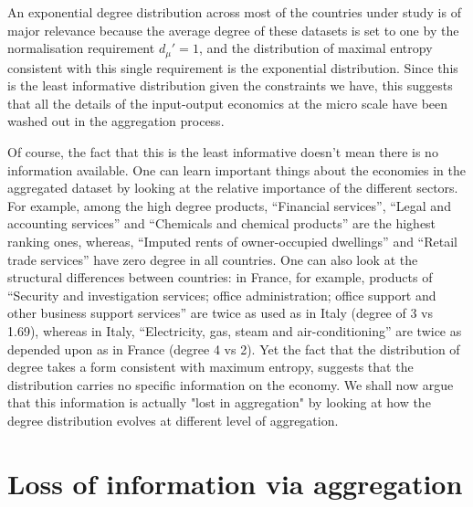 An exponential degree distribution across most of the countries under
study is of major relevance because the average degree of these
datasets is set to one by the normalisation requirement $d_\mu'=1$,
and the distribution of maximal entropy consistent with this
single requirement is the exponential distribution. Since this is the least
informative distribution given the constraints we have, this suggests
that all the details of the input-output economics at the micro scale
have been washed out in the aggregation process.

Of course, the fact that this is the least informative doesn't mean
there is no information available. One can learn important things
about the economies in the aggregated dataset by looking at the relative 
importance of the different sectors. For example, among the
high degree products, ``Financial services'', ``Legal and accounting
services'' and ``Chemicals and chemical products'' are the highest
ranking ones, whereas, ``Imputed rents of
owner-occupied dwellings'' and ``Retail trade services'' have zero
degree in all countries. One can also look at the structural
differences between countries: in France, for example, products of
``Security and investigation services; office administration; office
support and other business support services'' are twice as used as in
Italy (degree of 3 vs 1.69), whereas in Italy,
``Electricity, gas, steam and air-conditioning'' are twice as depended
upon as in France (degree 4 vs 2). Yet the fact that the distribution of
degree takes a form consistent with maximum entropy, suggests that
the distribution carries no specific information on the economy. 
We shall now argue that this information is actually "lost in aggregation"
by looking at how the degree distribution evolves at different level of aggregation.


\section{Loss of information via aggregation}
\label{sec:aggreg} 

